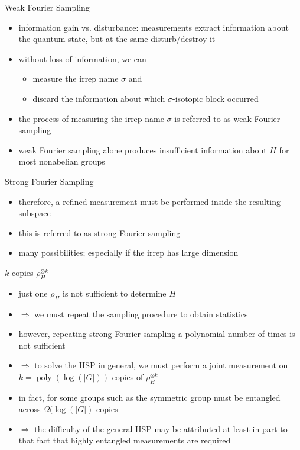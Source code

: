 \documentclass[slideColor]{prosper}
\newcommand{\poly}{\mathop{\mathrm{poly}}}
\renewcommand{\>}{\rangle}
\newcommand{\<}{\langle}
\begin{document}

\begin{slide}{Weak Fourier Sampling}
\begin{itemize}
\item information gain vs. disturbance: measurements extract information about the quantum state, but at the same disturb/destroy it
\item without loss of information, we can 
\begin{itemize}
\item measure the irrep name $\sigma$ and
\item discard the information about which $\sigma$-isotopic block occurred
\end{itemize}
\item the process of measuring the irrep name $\sigma$ is referred to as weak Fourier sampling
\item weak Fourier sampling alone produces insufficient information about $H$ for most nonabelian groups
\end{itemize}
\end{slide}


\begin{slide}{Strong Fourier Sampling}
\begin{itemize}
\item therefore, a refined measurement must be performed inside the resulting subspace
\item this is referred to as strong Fourier sampling
\item many possibilities; especially if the irrep has large dimension
\end{itemize}
\end{slide}


\begin{slide}{$k$ copies $\rho_H^{\otimes k}$}
\begin{itemize}
\item just one $\rho_H$ is not sufficient to determine $H$
\item $\Rightarrow$ we must repeat the sampling procedure to obtain statistics
\item however, repeating strong Fourier sampling a polynomial number of times is not sufficient
\item $\Rightarrow$ to solve the HSP in general, we must perform a joint measurement on $k=\poly(\log(|G|))$ copies of $\rho_H^{\otimes k}$
\item in fact, for some groups such as the symmetric group must be entangled across $\Omega(\log(|G|)$ copies
\item $\Rightarrow$ the difficulty of the general HSP may be
attributed at least in part to that fact that highly entangled
measurements are required
\end{itemize}
\end{slide}
\end{document}
